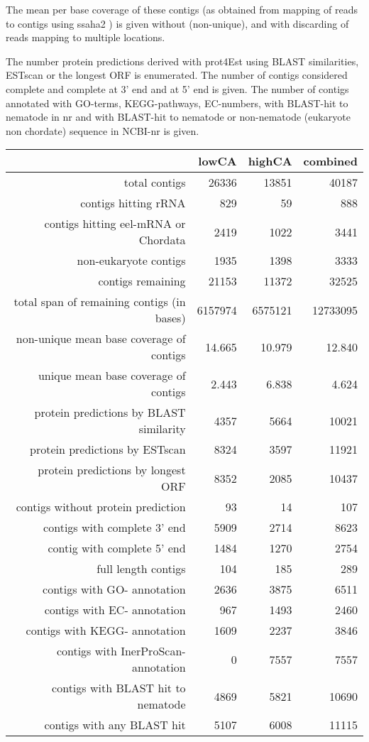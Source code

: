 \documentclass[10pt]{bmc_article}
\newenvironment{bmcformat}{\begin{raggedright}\baselineskip20pt\sloppy\setboolean{publ}{false}}{\end{raggedright}\baselineskip20pt\sloppy}
\begin{document}
\begin{bmcformat}
The mean per base coverage of these contigs (as obtained from mapping
of reads to contigs using ssaha2 \cite{pmid11591649}) is given without
(non-unique), and with discarding of reads mapping to multiple
locations.

The number protein predictions derived with prot4Est
\cite{wasmuth_prot4est:_2004} using BLAST similarities, ESTscan or the
longest ORF is enumerated. The number of contigs considered complete
and complete at 3' end and at 5' end is given. The number of contigs
annotated with GO-terms, KEGG-pathways, EC-numbers, with BLAST-hit to
nematode in nr and with BLAST-hit to nematode or non-nematode
(eukaryote non chordate) sequence in NCBI-nr is given.

\begin{table}[ht]
\begin{center}
\begin{tabular}{rrrr}
  \hline
 & lowCA & highCA & combined \\ 
  \hline
total contigs & 26336 & 13851 & 40187 \\ 
  contigs hitting rRNA & 829 & 59 & 888 \\ 
  contigs hitting eel-mRNA or Chordata & 2419 & 1022 & 3441 \\ 
  non-eukaryote contigs & 1935 & 1398 & 3333 \\ 
  contigs remaining & 21153 & 11372 & 32525 \\ 
  total span of remaining contigs (in bases) & 6157974 & 6575121 & 12733095 \\ 
  non-unique mean base coverage of contigs & 14.665 & 10.979 & 12.840 \\ 
  unique mean base coverage of contigs & 2.443 & 6.838 & 4.624 \\ 
  protein predictions by BLAST similarity & 4357 & 5664 & 10021 \\ 
  protein predictions by ESTscan & 8324 & 3597 & 11921 \\ 
  protein predictions by longest ORF & 8352 & 2085 & 10437 \\ 
  contigs without protein prediction & 93 & 14 & 107 \\ 
  contigs with complete 3' end & 5909 & 2714 & 8623 \\ 
  contig with complete 5' end & 1484 & 1270 & 2754 \\ 
  full length contigs & 104 & 185 & 289 \\ 
  contigs with GO- annotation & 2636 & 3875 & 6511 \\ 
  contigs with EC- annotation & 967 & 1493 & 2460 \\ 
  contigs with KEGG- annotation & 1609 & 2237 & 3846 \\ 
  contigs with InerProScan- annotation & 0 & 7557 & 7557 \\ 
  contigs with BLAST hit to nematode & 4869 & 5821 & 10690 \\ 
  contigs with any BLAST hit & 5107 & 6008 & 11115 \\ 
   \hline
\end{tabular}
\end{center}
\end{table}

\end{bmcformat}
\end{document}
